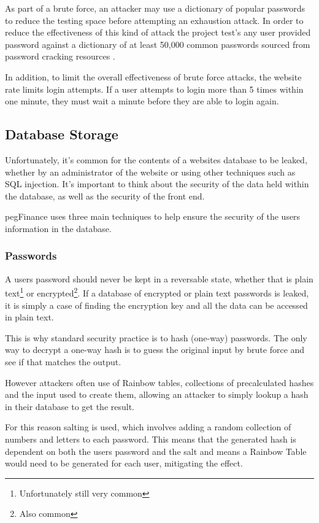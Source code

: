 As part of a brute force, an attacker may use a dictionary of popular passwords to reduce the testing space before attempting an exhaustion attack. In order to reduce the effectiveness of this kind of attack the project test's any user provided password against a dictionary of at least 50,000 common passwords sourced from password cracking resources \cite{burr2013electronic}.

In addition, to limit the overall effectiveness of brute force attacks, the website rate limits login attempts. If a user attempts to login more than 5 times within one minute, they must wait a minute before they are able to login again.

\subsection{Database Storage}
Unfortunately, it's common for the contents of a websites database to be leaked, whether by an administrator of the website or using other techniques such as SQL injection. It's important to think about the security of the data held within the database, as well as the security of the front end.

pegFinance uses three main techniques to help ensure the security of the users information in the database.

\subsubsection{Passwords}
A users password should never be kept in a reversable state, whether that is plain text\footnote{Unfortunately still very common} or encrypted\footnote{Also common}. If a database of encrypted or plain text passwords is leaked, it is simply a case of finding the encryption key and all the data can be accessed in plain text.

This is why standard security practice is to hash (one-way) passwords. The only way to decrypt a one-way hash is to guess the original input by brute force and see if that matches the output.

However attackers often use of Rainbow tables, collections of precalculated hashes and the input used to create them, allowing an attacker to simply lookup a hash in their database to get the result.

For this reason salting is used, which involves adding a random collection of numbers and letters to each password. This means that the generated hash is dependent on both the users password and the salt and means a Rainbow Table would need to be generated for each user, mitigating the effect.

